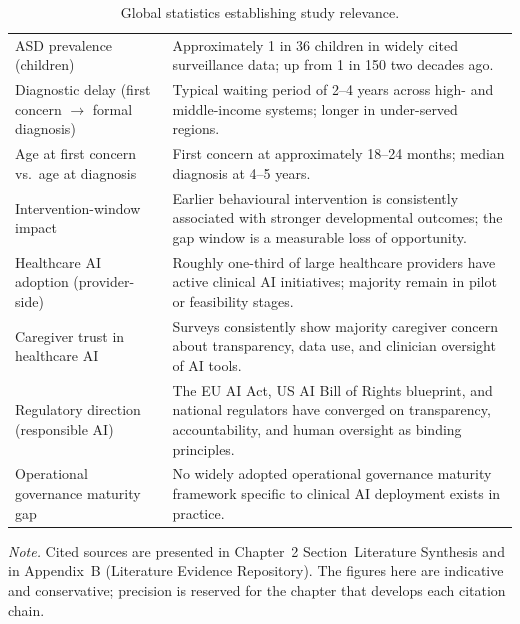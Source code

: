 {\tablestripes\tablefontsize
{}
\begin{xltabular}{\textwidth}{@{} >{\raggedright\arraybackslash}p{5cm} L @{}}
\caption[Global statistics establishing study relevance]{Global statistics establishing study relevance.}\label{tab:ch1_global_stats} \\
\toprule
{} &  \\
\midrule
\endfirsthead
\endhead
\bottomrule
\endlastfoot
ASD prevalence (children) & Approximately 1 in 36 children in widely cited surveillance data; up from 1 in 150 two decades ago. \\
\addlinespace
Diagnostic delay (first concern $\rightarrow$ formal diagnosis) & Typical waiting period of 2--4 years across high- and middle-income systems; longer in under-served regions. \\
\addlinespace
Age at first concern vs.\ age at diagnosis & First concern at approximately 18--24 months; median diagnosis at 4--5 years. \\
\addlinespace
Intervention-window impact & Earlier behavioural intervention is consistently associated with stronger developmental outcomes; the gap window is a measurable loss of opportunity. \\
\addlinespace
Healthcare AI adoption (provider-side) & Roughly one-third of large healthcare providers have active clinical AI initiatives; majority remain in pilot or feasibility stages. \\
\addlinespace
Caregiver trust in healthcare AI & Surveys consistently show majority caregiver concern about transparency, data use, and clinician oversight of AI tools. \\
\addlinespace
Regulatory direction (responsible AI) & The EU AI Act, US AI Bill of Rights blueprint, and national regulators have converged on transparency, accountability, and human oversight as binding principles. \\
\addlinespace
Operational governance maturity gap & No widely adopted operational governance maturity framework specific to clinical AI deployment exists in practice. \\
\end{xltabular}}

\vspace{0.3em}\noindent\textit{Note.} Cited sources are presented in Chapter~2 Section~Literature Synthesis and in Appendix~B (Literature Evidence Repository). The figures here are indicative and conservative; precision is reserved for the chapter that develops each citation chain.


